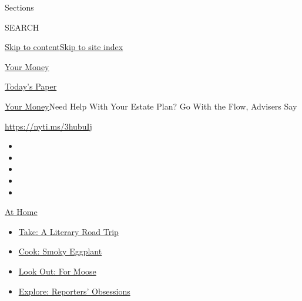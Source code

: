 Sections

SEARCH

\protect\hyperlink{site-content}{Skip to
content}\protect\hyperlink{site-index}{Skip to site index}

\href{https://www.nytimes3xbfgragh.onion/section/your-money}{Your Money}

\href{https://myaccount.nytimes3xbfgragh.onion/auth/login?response_type=cookie\&client_id=vi}{}

\href{https://www.nytimes3xbfgragh.onion/section/todayspaper}{Today's
Paper}

\href{/section/your-money}{Your Money}\textbar{}Need Help With Your
Estate Plan? Go With the Flow, Advisers Say

\url{https://nyti.ms/3hubuIj}

\begin{itemize}
\item
\item
\item
\item
\item
\end{itemize}

\href{https://www.nytimes3xbfgragh.onion/spotlight/at-home?action=click\&pgtype=Article\&state=default\&region=TOP_BANNER\&context=at_home_menu}{At
Home}

\begin{itemize}
\tightlist
\item
  \href{https://www.nytimes3xbfgragh.onion/2020/07/28/books/time-for-a-literary-road-trip.html?action=click\&pgtype=Article\&state=default\&region=TOP_BANNER\&context=at_home_menu}{Take:
  A Literary Road Trip}
\item
  \href{https://www.nytimes3xbfgragh.onion/2020/07/29/magazine/bored-with-your-home-cooking-some-smoky-eggplant-will-fix-that.html?action=click\&pgtype=Article\&state=default\&region=TOP_BANNER\&context=at_home_menu}{Cook:
  Smoky Eggplant}
\item
  \href{https://www.nytimes3xbfgragh.onion/2020/07/27/travel/moose-michigan-isle-royale.html?action=click\&pgtype=Article\&state=default\&region=TOP_BANNER\&context=at_home_menu}{Look
  Out: For Moose}
\item
  \href{https://www.nytimes3xbfgragh.onion/interactive/2020/at-home/even-more-reporters-editors-diaries-lists-recommendations.html?action=click\&pgtype=Article\&state=default\&region=TOP_BANNER\&context=at_home_menu}{Explore:
  Reporters' Obsessions}
\end{itemize}

